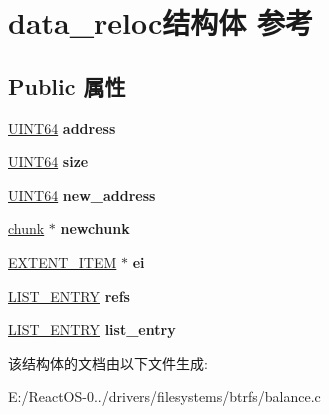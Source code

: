 \hypertarget{structdata__reloc}{}\section{data\+\_\+reloc结构体 参考}
\label{structdata__reloc}
\subsection*{Public 属性}
\begin{DoxyCompactItemize}
\item 
\mbox{\label{structdata__reloc_a1f8f2c03ed225ca2044dd903c7fcda98}} 
\hyperlink{_processor_bind_8h_a57be03562867144161c1bfee95ca8f7c}{U\+I\+N\+T64} {\bfseries address}
\item 
\mbox{\label{structdata__reloc_a7a295e5be318187dba8db0c574cc77ab}} 
\hyperlink{_processor_bind_8h_a57be03562867144161c1bfee95ca8f7c}{U\+I\+N\+T64} {\bfseries size}
\item 
\mbox{\label{structdata__reloc_afbe7477ecf761db69dc8f8f010fec6ba}} 
\hyperlink{_processor_bind_8h_a57be03562867144161c1bfee95ca8f7c}{U\+I\+N\+T64} {\bfseries new\+\_\+address}
\item 
\mbox{\label{structdata__reloc_a9082455e7f4bd91bd200106f26a55475}} 
\hyperlink{structchunk}{chunk} $\ast$ {\bfseries newchunk}
\item 
\mbox{\label{structdata__reloc_acfd3054902e7ee7cadbebb49dde24911}} 
\hyperlink{struct_e_x_t_e_n_t___i_t_e_m}{E\+X\+T\+E\+N\+T\+\_\+\+I\+T\+EM} $\ast$ {\bfseries ei}
\item 
\mbox{\label{structdata__reloc_aa942a7b1c26d95af2de360afe33059f0}} 
\hyperlink{struct___l_i_s_t___e_n_t_r_y}{L\+I\+S\+T\+\_\+\+E\+N\+T\+RY} {\bfseries refs}
\item 
\mbox{\label{structdata__reloc_ab82176f0aaf026abea59eac9be280b52}} 
\hyperlink{struct___l_i_s_t___e_n_t_r_y}{L\+I\+S\+T\+\_\+\+E\+N\+T\+RY} {\bfseries list\+\_\+entry}
\end{DoxyCompactItemize}


该结构体的文档由以下文件生成\+:\begin{DoxyCompactItemize}
\item 
E\+:/\+React\+O\+S-\/0../drivers/filesystems/btrfs/balance.\+c\end{DoxyCompactItemize}
